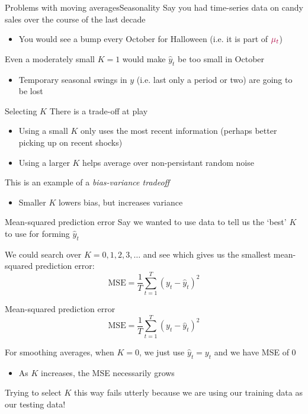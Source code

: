 \documentclass[aspectratio=169,t,11pt,table]{beamer}
\begin{document}
\begin{frame}{Problems with moving averages}{Seasonality}
  Say you had time-series data on candy sales over the course of the last decade
  \begin{itemize}
    \item You would see a bump every October for Halloween (i.e. it is part of ${\color[HTML]{B3114B} \mu_t}$)
  \end{itemize}

  \bigskip
  Even a moderately small $K = 1$ would make $\hat{y}_t$ be too small in October
  \begin{itemize}
    \item Temporary seasonal swings in $y$ (i.e. last only a period or two) are going to be lost
  \end{itemize}
\end{frame}


\begin{frame}{Selecting $K$}
  There is a trade-off at play
  \begin{itemize}
    \item Using a small $K$ only uses the most recent information (perhaps better picking up on recent shocks)
    
    \item Using a larger $K$ helps average over non-persistant random noise
  \end{itemize}

  \pause
  \bigskip
  This is an example of a \emph{bias-variance tradeoff}
  \begin{itemize}
    \item Smaller $K$ lowers bias, but increases variance
  \end{itemize}
\end{frame}

\begin{frame}{Mean-squared prediction error}
  Say we wanted to use data to tell us the `best' $K$ to use for forming $\hat{y}_t$

  \bigskip
  We could search over $K = 0, 1, 2, 3, \dots$ and see which gives us the smallest mean-squared prediction error:
  $$
    \text{MSE} = \frac{1}{T} \sum_{t=1}^T (y_t - \hat{y}_t)^2
  $$
\end{frame}

\begin{frame}{Mean-squared prediction error}
  \vspace*{-\bigskipamount}
  $$
    \text{MSE} = \frac{1}{T} \sum_{t=1}^T (y_t - \hat{y}_t)^2
  $$
  
  \bigskip
  For smoothing averages, when $K = 0$, we just use $\hat{y}_t = y_t$ and we have MSE of $0$
  \begin{itemize}
    \item As $K$ increases, the MSE necessarily grows
  \end{itemize}

  \bigskip
  Trying to select $K$ this way fails utterly because we are using our training data as our testing data!
\end{frame}
\end{document}
